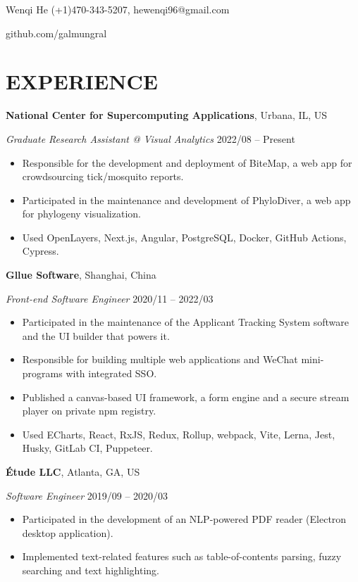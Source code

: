 \documentclass[10pt]{article}
\begin{document}
{\Huge\sc Wenqi He} \hfill (+1)470-343-5207, hewenqi96@gmail.com

\hfill github.com/galmungral

\section*{EXPERIENCE}
\textbf{National Center for Supercomputing Applications}, Urbana, IL, US

\textit{Graduate Research Assistant @ Visual Analytics} \hfill 2022/08 -- Present

\begin{itemize}[itemsep=0pt, topsep=4pt, label=-]
\item Responsible for the development and deployment of BiteMap, a web app for crowdsourcing tick/mosquito reports.
\item Participated in the maintenance and development of PhyloDiver, a web app for phylogeny visualization.
\item Used OpenLayers, Next.js, Angular, PostgreSQL, Docker, GitHub Actions, Cypress.
\end{itemize}

\vspace{0.5em}
\textbf{Gllue Software}, Shanghai, China

\textit{Front-end Software Engineer}  \hfill 2020/11 -- 2022/03

\begin{itemize}[itemsep=0pt, topsep=4pt, label=-]
\item Participated in the maintenance of the Applicant Tracking System software and the UI builder that powers it.
\item Responsible for building multiple web applications and WeChat mini-programs with integrated SSO.
\item Published a canvas-based UI framework, a form engine and a secure stream player on private npm registry.
\item Used ECharts, React, RxJS, Redux, Rollup, webpack, Vite, Lerna, Jest, Husky, GitLab CI, Puppeteer.
\end{itemize}
\vspace{0.5em}
\textbf{Étude LLC}, Atlanta, GA, US

\textit{Software Engineer} \hfill 2019/09 -- 2020/03

\begin{itemize}[itemsep=0pt, topsep=4pt, label=-]
\item Participated in the development of an NLP-powered PDF reader (Electron desktop application).
\item Implemented text-related features such as table-of-contents parsing, fuzzy searching and text highlighting.
\end{itemize}
\end{document}

